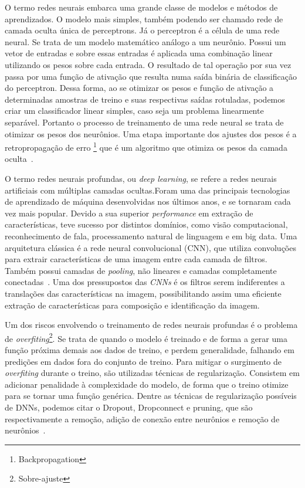 O termo redes neurais embarca uma grande classe de modelos e métodos de aprendizados. O modelo mais simples, também podendo ser chamado rede de camada oculta única de perceptrons. Já o  perceptron é a célula de uma rede neural. Se trata de um modelo matemático análogo a um neurônio. Possui um vetor de entradas e sobre essas entradas é aplicada uma combinação linear utilizando os pesos sobre cada entrada. O resultado de tal operação por sua vez passa por uma função de ativação que resulta numa saída binária de classificação do perceptron. Dessa forma, ao se otimizar os pesos e função de ativação a determinadas amostras de treino e suas respectivas saídas rotuladas, podemos criar um classificador linear simples, caso seja um problema linearmente separável. Portanto o processo de treinamento de uma rede neural se trata de otimizar os pesos dos neurônios. Uma etapa importante dos ajustes dos pesos é a retropropagação de erro \footnote{Backpropagation} que é um algoritmo que otimiza os pesos da camada oculta~\cite{hastie01statisticallearning}.

O termo redes neurais profundas, ou \textit{deep learning}, se refere a redes neurais artificiais com múltiplas camadas ocultas.Foram uma das principais tecnologias de aprendizado de máquina desenvolvidas nos últimos anos, e se tornaram cada vez mais popular. Devido a sua superior \textit{performance} em extração de características, teve sucesso por distintos domínios, como visão computacional, reconhecimento de fala, processamento natural de linguagem e em big data. Uma arquitetura clássica é a rede neural convolucional (CNN), que utiliza convoluções para extrair características de uma imagem entre cada camada de filtros. Também possui camadas de \textit{pooling}, não lineares e camadas completamente conectadas~\cite{8308186}. Uma dos pressupostos das \textit{CNNs} é os filtros serem indiferentes a translações das características na imagem, possibilitando assim uma eficiente extração de características para composição e identificação da imagem.

Um dos riscos envolvendo o treinamento de redes neurais profundas é o problema de \textit{overfiting}\footnote{Sobre-ajuste}. Se trata de quando o modelo é treinado e de forma a gerar uma função próxima demais aos dados de treino, e perdem generalidade, falhando em predições em dados fora do conjunto de treino. Para mitigar o surgimento de \textit{overfiting} durante o treino, são utilizadas técnicas de regularização. Consistem em adicionar penalidade à complexidade do modelo, de forma que o treino otimize para se tornar uma função genérica. Dentre as técnicas de regularização possíveis de DNNs, podemos citar o Dropout, Dropconnect e pruning, que são respectivamente a remoção, adição de conexão entre neurônios e remoção de neurônios~\cite{hastie01statisticallearning}.

